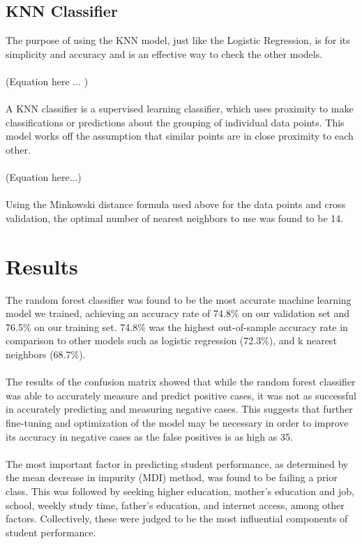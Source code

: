 \documentclass[twoside,twocolumn]{article}
\begin{document}
\subsection{KNN Classifier}
The purpose of using the KNN model, just like the Logistic Regression, is for its simplicity and accuracy and is an effective way to check the other models.
\\ \\
(Equation here ... )
\\ \\
A KNN classifier is a supervised learning classifier, which uses proximity to make classifications or predictions about the grouping of individual data points. This model works off the assumption that similar points are in close proximity to each other.
\\ \\
(Equation here...)
\\ \\
Using the Minkowski distance formula used above for the data points and cross validation, the optimal number of nearest neighbors to use was found to be 14. 


\section{Results}
The random forest classifier was found to be the most accurate machine learning model we trained, achieving an accuracy rate of 74.8\% on our validation set and 76.5\% on our training set. 74.8\% was the highest out-of-sample accuracy rate in comparison to other models such as logistic regression (72.3\%), and k nearest neighbors (68.7\%).
\\ \\
The results of the confusion matrix showed that while the random forest classifier was able to accurately measure and predict positive cases, it was not as successful in accurately predicting and measuring negative cases. This suggests that further fine-tuning and optimization of the model may be necessary in order to improve its accuracy in negative cases as the false positives is as high as 35.
\\ \\
The most important factor in predicting student performance, as determined by the mean decrease in impurity (MDI) method, was found to be failing a prior class. This was followed by seeking higher education, mother's education and job, school, weekly study time, father's education, and internet access, among other factors. Collectively, these were judged to be the most influential components of student performance.
\end{document}
